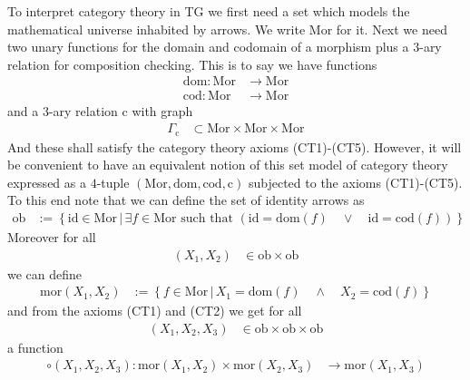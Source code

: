\nocite{53fd7d7e}
To interpret category theory in TG we first need a set which models the mathematical universe inhabited by arrows. We write $\mathrm{Mor}$ for it. Next we need two unary functions for the domain and codomain of a morphism plus a $3$-ary relation for composition checking. This is to say we have functions
\begin{align*}
  \mathrm{dom}
  \colon
  \mathrm{Mor}
  &\rightarrow
  \mathrm{Mor}
  \\
  \mathrm{cod}
  \colon
  \mathrm{Mor}
  &\rightarrow
  \mathrm{Mor}
\end{align*}
and a $3$-ary relation $\mathrm{c}$ with graph
\begin{align*}
  \Gamma_{\mathrm{c}}
  &\subset
  \mathrm{Mor}
  \times
  \mathrm{Mor}
  \times
  \mathrm{Mor}
\end{align*}
And these shall satisfy the category theory axioms (CT1)-(CT5). However, it will be convenient to have an equivalent notion of this set model of category theory expressed as a $4$-tuple $(\mathrm{Mor},\mathrm{dom},\mathrm{cod},\mathrm{c})$ subjected to the axioms (CT1)-(CT5). To this end note that we can define the set of identity arrows as
\begin{align*}
  \mathrm{ob}
  &:=
  \left\lbrace
      \mathrm{id}
      \in
      \mathrm{Mor}
    \,
    \vert
    \,
      \exists
      f
      \in
      \mathrm{Mor}
      \text{ such that }
      \left(
        \mathrm{id}
        =
        \mathrm{dom}(f)
        \quad
        \lor
        \quad
        \mathrm{id}
        =
        \mathrm{cod}(f)
      \right)
  \right\rbrace
\end{align*}
Moreover for all
\begin{align*}
  (X_{1},X_{2})
  &\in
  \mathrm{ob}
  \times
  \mathrm{ob}
\end{align*}
we can define
\begin{align*}
  \mathrm{mor}(X_{1},X_{2})
  &:=
  \left\lbrace
      f
      \in
      \mathrm{Mor}
    \,
    \vert
    \,
      X_{1}
      =
      \mathrm{dom}(f)
      \quad
      \land
      \quad
      X_{2}
      =
      \mathrm{cod}(f)
  \right\rbrace
\end{align*}
and from the axioms (CT1) and (CT2) we get for all
\begin{align*}
  (X_{1},X_{2},X_{3})
  &\in
  \mathrm{ob}
  \times
  \mathrm{ob}
  \times
  \mathrm{ob}
\end{align*}
a function
\begin{align*}
  \circ(X_{1},X_{2},X_{3})
  \colon
  \mathrm{mor}(X_{1},X_{2})
  \times
  \mathrm{mor}(X_{2},X_{3})
  &\rightarrow
  \mathrm{mor}(X_{1},X_{3})
\end{align*}
